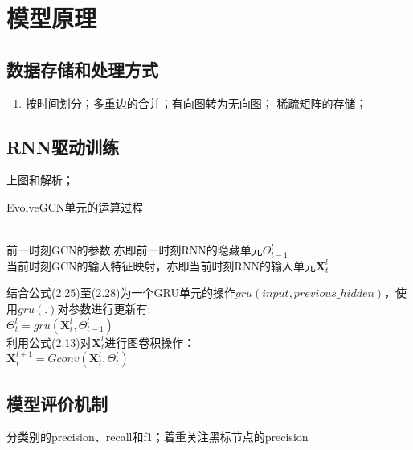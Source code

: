 \chapter{模型原理} \label{chpt:C}
  \section{数据存储和处理方式}
  \begin{enumerate}
    \item 按时间划分；多重边的合并；有向图转为无向图； 稀疏矩阵的存储；
  \end{enumerate}
  
  \section{RNN驱动训练}
  上图和解析；
  
  \begin{algorithm}[htbp]
    \caption{EvolveGCN单元的运算过程}
    \label{alg:GCN-process}
    \hspace*{0.04in}{\bf Inputs:}\\
    前一时刻GCN的参数,亦即前一时刻RNN的隐藏单元$\Theta_{t-1}^{l}$ \\
    当前时刻GCN的输入特征映射，亦即当前时刻RNN的输入单元$\mathbf{X}_{t}^{l}$ \\
    \begin{algorithmic}[1]
      \State 结合公式(2.25)至(2.28)为一个GRU单元的操作$gru(input, previous\_hidden)$，使用$gru(.)$对参数进行更新有:\\
      $\Theta_{t}^{l} = gru(\mathbf{X}_{t}^{l}, \Theta_{t-1}^{l})$ \\
      利用公式(2.13)对$\mathbf{X}_{t}^{l}$进行图卷积操作：\\
      $\mathbf{X}_{t}^{l+1} = Gconv(\mathbf{X}_{t}^{l}, \Theta_{t}^{l})$
      
    \end{algorithmic}
  \end{algorithm}
  
  \section{模型评价机制}
  分类别的precision、recall和f1；着重关注黑标节点的precision


